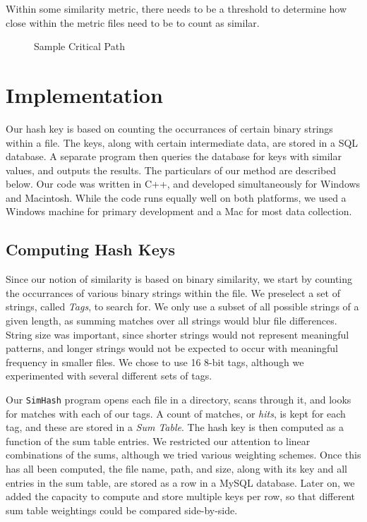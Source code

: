 \documentclass[10pt, twocolumn]{article}
\begin{document}
Within some similarity metric, there needs to be a threshold to determine how close within the metric files need to be to count as similar. 

 \begin{figure}[h] 
 \centering
\caption{Sample Critical Path}
\label{CritDiag} 
\end{figure}    




\section{Implementation}

Our hash key is based on counting the occurrances of certain binary strings within a file.  The keys, along with certain intermediate data, are stored in a SQL database.  A separate program then queries the database for keys with similar values, and outputs the results.  The particulars of our method are described below.  Our code was written in C++, and developed simultaneously for Windows and Macintosh.  While the code runs equally well on both platforms, we used a Windows machine for primary development and a Mac for most data collection.

\subsection{Computing Hash Keys}

Since our notion of similarity is based on binary similarity, we start by counting the occurrances of various binary strings within the file.  We preselect a set of strings, called {\it Tags}, to search for.  We only use a subset of all possible strings of a given length, as summing matches over all strings would blur file differences.  String size was important, since shorter strings would not represent meaningful patterns, and longer strings would not be expected to occur with meaningful frequency in smaller files.  We chose to use 16 8-bit tags, although we experimented with several different sets of tags.

Our {\tt SimHash} program opens each file in a directory, scans through it, and looks for matches with each of our tags.  A count of matches, or {\it hits}, is kept for each tag, and these are stored in a {\it Sum Table}.  The hash key is then computed as a function of the sum table entries.  We restricted our attention to linear combinations of the sums, although we tried various weighting schemes.  Once this has all been computed, the file name, path, and size, along with its key and all entries in the sum table, are stored as a row in  a MySQL database.  Later on, we added the capacity to compute and store multiple keys per row, so that different sum table weightings could be compared side-by-side.
\end{document}
